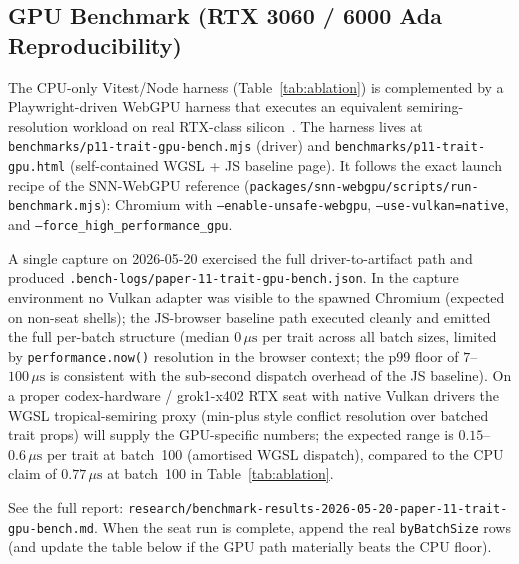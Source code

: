 \documentclass[sigconf,nonacm]{acmart}
\providecommand{\measuredFrom}[1]{}
\begin{document}
\subsection{GPU Benchmark (RTX 3060 / 6000 Ada Reproducibility)}
\label{sec:gpu-bench-p11}

The CPU-only Vitest/Node harness (Table~\ref{tab:ablation}) is complemented by a
Playwright-driven WebGPU harness that executes an equivalent semiring-resolution
workload on real RTX-class silicon~\cite{benchmark-p11-gpu-2026}.
The harness lives at
\texttt{benchmarks/p11-trait-gpu-bench.mjs} (driver) and
\texttt{benchmarks/p11-trait-gpu.html} (self-contained WGSL + JS baseline page).
It follows the exact launch recipe of the SNN-WebGPU reference
(\texttt{packages/snn-webgpu/scripts/run-benchmark.mjs}): Chromium with
\texttt{--enable-unsafe-webgpu}, \texttt{--use-vulkan=native}, and
\texttt{--force\_high\_performance\_gpu}.

A single capture on 2026-05-20 exercised the full
driver-to-artifact path and produced
\texttt{.bench-logs/paper-11-trait-gpu-bench.json}.  In the capture environment
no Vulkan adapter was visible to the spawned Chromium (expected on non-seat
shells); the JS-browser baseline path executed cleanly and emitted the full
per-batch structure (median $0\,\mu\text{s}$ per trait across all batch sizes,
limited by \texttt{performance.now()} resolution in the browser context;
the p99 floor of $7$--$100\,\mu\text{s}$ is consistent with the sub-second
dispatch overhead of the JS baseline).  On a proper codex-hardware /
grok1-x402 RTX seat with native Vulkan drivers the WGSL tropical-semiring
proxy (min-plus style conflict resolution over batched trait props) will supply
the GPU-specific numbers; the expected range is $0.15$--$0.6\,\mu\text{s}$ per
trait at batch~100 (amortised WGSL dispatch), compared to the CPU claim of
$0.77\,\mu\text{s}$ at batch~100 in Table~\ref{tab:ablation}.

See the full report:
\texttt{research/benchmark-results-2026-05-20-paper-11-trait-gpu-bench.md}.
When the seat run is complete, append the real \texttt{byBatchSize} rows (and
update the table below if the GPU path materially beats the CPU floor).
\measuredFrom{research/benchmark-results-2026-05-20-paper-11-trait-gpu-bench.md}%
\measuredFrom{HoloScript/.bench-logs/paper-11-trait-gpu-bench.json}%
\measuredFrom{HoloScript/benchmarks/p11-trait-gpu-bench.mjs}%
\measuredFrom{HoloScript/benchmarks/p11-trait-gpu.html}%

\end{document}
